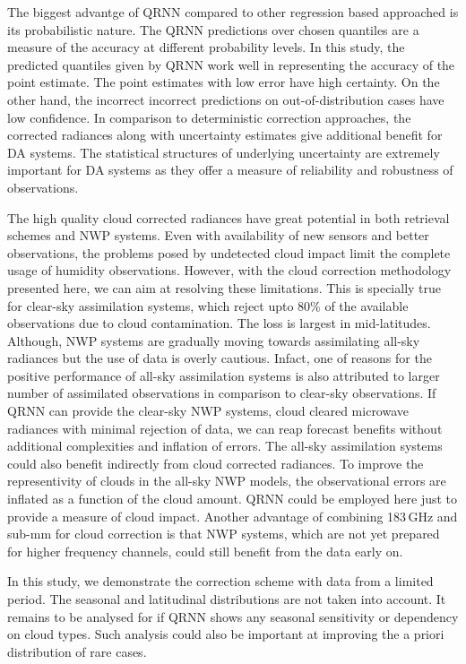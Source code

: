 \documentclass[amt, manuscript]{copernicus}
\begin{document}
The biggest advantge of QRNN compared to other regression based approached is its probabilistic nature. The QRNN predictions over chosen quantiles are a measure of the accuracy at different probability levels. In this study, the predicted quantiles given by QRNN work well in representing the accuracy of the point estimate. The point estimates with low error have high certainty. On the other hand, the incorrect incorrect predictions on out-of-distribution cases have low confidence. In comparison to deterministic correction approaches, the corrected radiances along with uncertainty estimates give additional benefit for DA systems. The statistical structures of underlying uncertainty are extremely important for DA systems as they offer a measure of reliability and robustness of observations.


The high quality cloud corrected radiances have great potential in both retrieval schemes and  NWP systems. Even with availability of new sensors and better observations, the problems posed by undetected cloud impact limit the complete usage of humidity observations. However, with the cloud correction methodology presented here, we can aim at resolving these limitations. This is specially true for clear-sky assimilation systems, which reject upto 80\% of the available observations due to cloud contamination. The loss is largest in mid-latitudes. Although, NWP systems are gradually moving towards assimilating all-sky radiances but the use of data is overly cautious. Infact, one of reasons for the positive performance of all-sky assimilation systems is also attributed to larger number of assimilated observations in comparison to clear-sky observations. If QRNN can provide the clear-sky NWP systems, cloud cleared microwave radiances with minimal rejection of data, we can reap forecast benefits without  additional complexities and inflation of errors. The all-sky assimilation systems could also benefit indirectly from cloud corrected radiances. To improve the representivity of clouds in the all-sky NWP models, the observational errors are inflated as a function of the cloud amount. QRNN could be employed here just to provide a measure of cloud impact. Another advantage of combining 183\,GHz and sub-mm for cloud correction is that NWP systems, which are not yet prepared for higher frequency channels, could still benefit from the data early on. 

In this study, we demonstrate the correction scheme with data from a limited period. The seasonal and latitudinal distributions are not taken into account. It remains to be  analysed for if QRNN shows any seasonal sensitivity or dependency on cloud types. Such analysis could also be important at improving the a priori distribution of rare cases. 
\end{document}
